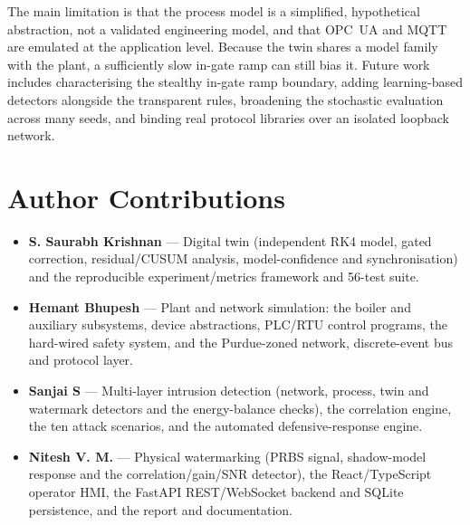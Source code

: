 \documentclass[11pt,a4paper]{article}
\begin{document}
The main limitation is that the process model is a simplified, hypothetical abstraction, not a validated engineering model, and that OPC~UA and MQTT are emulated at the application level. Because the twin shares a model family with the plant, a sufficiently slow in-gate ramp can still bias it. Future work includes characterising the stealthy in-gate ramp boundary, adding learning-based detectors alongside the transparent rules, broadening the stochastic evaluation across many seeds, and binding real protocol libraries over an isolated loopback network.

\section*{Author Contributions}
\begin{itemize}
\item \textbf{S. Saurabh Krishnan} --- Digital twin (independent RK4 model, gated correction, residual/CUSUM analysis, model-confidence and synchronisation) and the reproducible experiment/metrics framework and 56-test suite.
\item \textbf{Hemant Bhupesh} --- Plant and network simulation: the boiler and auxiliary subsystems, device abstractions, PLC/RTU control programs, the hard-wired safety system, and the Purdue-zoned network, discrete-event bus and protocol layer.
\item \textbf{Sanjai S} --- Multi-layer intrusion detection (network, process, twin and watermark detectors and the energy-balance checks), the correlation engine, the ten attack scenarios, and the automated defensive-response engine.
\item \textbf{Nitesh V. M.} --- Physical watermarking (PRBS signal, shadow-model response and the correlation/gain/SNR detector), the React/TypeScript operator HMI, the FastAPI REST/WebSocket backend and SQLite persistence, and the report and documentation.
\end{itemize}
\end{document}
